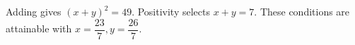 Adding gives $(x+y)^2=49 $. Positivity selects $\boxed{x+y=7}$. These conditions are attainable with $ x=\dfrac{23}{7},y=\dfrac{26}{7}$.
